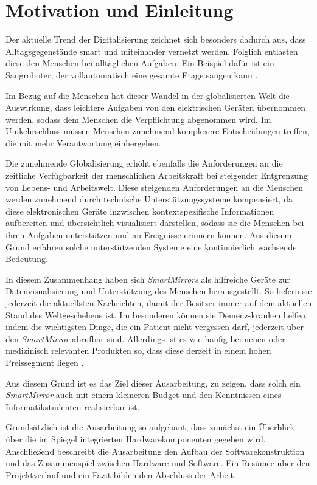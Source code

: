\section{Motivation und Einleitung}
Der aktuelle Trend der Digitalisierung zeichnet sich besonders dadurch aus, dass Alltagsgegenstände smart und miteinander vernetzt werden. Folglich entlasten diese den Menschen bei alltäglichen Aufgaben. Ein Beispiel dafür ist ein Saugroboter, der vollautomatisch eine gesamte Etage saugen kann \cite{irobot2017}.\cite{kagermann2017mobilitatswende}

Im Bezug auf die Menschen hat dieser Wandel in der globalisierten Welt die Auswirkung, dass leichtere Aufgaben von den elektrischen Geräten übernommen werden, sodass dem Menschen die Verpflichtung abgenommen wird. Im Umkehrschluss müssen Menschen zunehmend komplexere Entscheidungen treffen, die mit mehr Verantwortung einhergehen. \cite{Norbisrath:62365}

Die zunehmende Globalisierung erhöht ebenfalls die Anforderungen an die zeitliche Verfügbarkeit der menschlichen Arbeitskraft bei steigender Entgrenzung von Lebens- und Arbeitswelt. Diese steigenden Anforderungen an die Menschen werden zunehmend durch technische Unterstützungssysteme kompensiert, da diese elektronischen Geräte inzwischen kontextspezifische Informationen aufbereiten und übersichtlich visualisiert darstellen, sodass sie die Menschen bei ihren Aufgaben unterstützen und an Ereignisse erinnern können. Aus diesem Grund erfahren solche unterstützenden Systeme eine kontinuierlich wachsende Bedeutung.

In diesem Zusammenhang haben sich \textit{SmartMirrors} als hilfreiche Geräte zur Datenvisualisierung und Unterstützung des Menschen herausgestellt. So liefern sie jederzeit die aktuellsten Nachrichten, damit der Besitzer immer auf dem aktuellen Stand des Weltgeschehens ist. Im besonderen können sie Demenz-kranken helfen, indem die wichtigsten Dinge, die ein Patient nicht vergessen darf, jederzeit über den \textit{SmartMirror} abrufbar sind. Allerdings ist es wie häufig bei neuen oder medizinisch relevanten Produkten so, dass diese derzeit in einem hohen Preissegment liegen \cite{marketresearch16smartmirror}.

Aus diesem Grund ist es das Ziel dieser Ausarbeitung, zu zeigen, dass solch ein \textit{SmartMirror} auch mit einem kleineren Budget und den Kenntnissen eines Informatikstudenten realisierbar ist.

Grundsätzlich ist die Ausarbeitung so aufgebaut, dass zunächst ein Überblick über die im Spiegel integrierten Hardwarekomponenten gegeben wird. Anschließend beschreibt die Ausarbeitung den Aufbau der Softwarekonstruktion und das Zusammenspiel zwischen Hardware und Software. Ein Resümee über den Projektverlauf und ein Fazit bilden den Abschluss der Arbeit.



